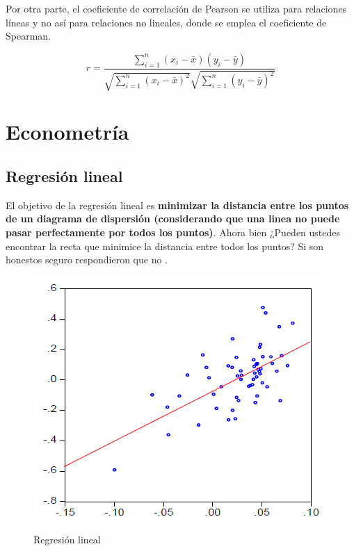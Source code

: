 \documentclass[
]{book}
\begin{document}
Por otra parte, el coeficiente de correlación de Pearson se utiliza para relaciones líneas y no así para relaciones no lineales, donde se emplea el coeficiente de Spearman.

\[ r = \frac{\sum_{i=1}^{n}(x_i-\bar{x})(y_i-\bar{y})}{\sqrt{\sum_{i=1}^{n}(x_i-\bar{x})^2}\sqrt{\sum_{i=1}^{n}(y_i-\bar{y})^2}} \]

\hypertarget{econometruxeda}{%
\section{Econometría}\label{econometruxeda}}

\hypertarget{regresiuxf3n-lineal}{%
\subsection{Regresión lineal}\label{regresiuxf3n-lineal}}

El objetivo de la regresión lineal es \textbf{minimizar la distancia entre los puntos de un diagrama de dispersión (considerando que una linea no puede pasar perfectamente por todos los puntos)}. Ahora bien ¿Pueden ustedes encontrar la recta que minimice la distancia entre todos los puntos? Si son honestos seguro respondieron que no \citep{Maddala1996}.

\begin{figure}

{\centering \includegraphics[width=0.8\linewidth]{imagenes/regresion} 

}

\caption{Regresión lineal}\label{fig:unnamed-chunk-3}
\end{figure}
\end{document}
